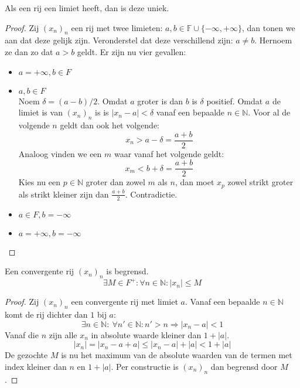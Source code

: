 \documentclass[main.tex]{subfiles}
\begin{document}
\begin{pr}
  Als een rij een limiet heeft, dan is deze uniek.

  \begin{proof}
    Zij $(x_{n})_{n}$ een rij met twee limieten: $a,b \in \mathbb{F}\cup \{-\infty,+\infty\}$, dan tonen we aan dat deze gelijk zijn.
    Veronderstel dat deze verschillend zijn: $a \neq b$.
    Hernoem ze dan zo dat $a > b$ geldt.
    Er zijn nu vier gevallen:
    \begin{itemize}
    \item $a = +\infty, b \in F$\\
    \item $a,b\in F$\\
      Noem $\delta = (a-b)/2$.
      Omdat $a$ groter is dan $b$ is $\delta$ positief.
      Omdat $a$ de limiet is van $(x_{n})_{n}$ is is $|x_{n}-a|<\delta$ vanaf een bepaalde $n\in \mathbb{N}$.
      Voor al de volgende $n$ geldt dan ook het volgende:
      \[ x_{n}>a-\delta = \frac{a+b}{2} \]
      Analoog vinden we een $m$ waar vanaf het volgende geldt:
      \[ x_{m}<b+\delta=\frac{a+b}{2} \]
      Kies nu een $p\in \mathbb{N}$ groter dan zowel $m$ als $n$, dan moet $x_{p}$ zowel strikt groter als strikt kleiner zijn dan $\frac{a+b}{2}$.
      Contradictie.
    \item $a\in F, b = -\infty$\\
    \item $a= +\infty, b=-\infty$\\
    \end{itemize}
  \end{proof}
\end{pr}

\begin{pr}
  \label{pr:convergente-rij-begrensd}
  Een convergente rij $(x_{n})_{n}$ is begrensd.
  \[ \exists M \in F^{+}: \forall n\in \mathbb{N}: |x_{n}| \le M \]

  \begin{proof}
    Zij $(x_{n})_{n}$ een convergente rij met limiet $a$.
    Vanaf een bepaalde $n\in \mathbb{N}$ komt de rij dichter dan $1$ bij $a$:
    \[ \exists n\in \mathbb{N}:\ \forall n'\in \mathbb{N}: n'>n\Rightarrow |x_{n}-a|<1 \]
    Vanaf die $n$ zijn alle $x_{n}$ in absolute waarde kleiner dan $1+|a|$.
    \[ |x_{n}| = |x_{n}-a+a| \le |x_{n}-a|+|a| <1+|a| \]
    De gezochte $M$ is nu het maximum van de absolute waarden van de termen met index kleiner dan $n$ en $1+|a|$.
    Per constructie is $(x_{n})_{n}$ dan begrensd door $M$.
  \end{proof}
\end{pr}
\end{document}
